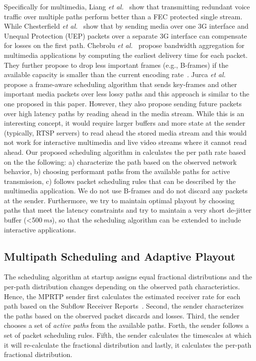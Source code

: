 Specifically for multimedia, Liang \emph{et al.}~\cite{Liang01} show that
transmitting redundant voice traffic over multiple paths perform better than a
FEC protected single stream. While Chesterfield \emph{et al.}~\cite{1498479}
show that by sending media over one 3G interface and Unequal Protection (UEP)
packets over a separate 3G interface can compensate for losses on the first
path. Chebrolu \emph{et al.}~\cite{1599407} propose bandwidth aggregation for
multimedia applications by computing the earliest delivery time for each
packet. They further propose to drop less important frames (e.g., B-frames) if
the available capacity is smaller than the current encoding
rate~\cite{1313320}. Jurca \emph{et al.}~\cite{4130370:jurca} propose a
frame-aware scheduling algorithm that sends key-frames and other important
media packets over less lossy paths and this approach is similar to the one
proposed in this paper. However, they also propose sending future packets over
high latency paths by reading ahead in the media stream. While this is an
interesting concept, it would require larger buffers and more state at the
sender (typically, RTSP servers) to read ahead the stored media stream and
this would not work for interactive multimedia and live video streams where it
cannot read ahead. Our proposed scheduling algorithm in 
calculates the per path rate based on the the following: a) characterize the
path based on the observed network behavior, b) choosing performant paths from
the available paths for active transmission, c) follows packet scheduling
rules that can be described by the multimedia application. We do not use
B-frames and do not discard any packets at the sender. Furthermore, we try to
maintain optimal playout by choosing paths that meet the latency constraints
and try to maintain a very short de-jitter buffer (<500\,\emph{ms}), so that
the scheduling algorithm can be extended to include interactive applications.
\subsection{Multipath Scheduling and Adaptive Playout}

The scheduling algorithm at startup assigns equal fractional distributions and
the per-path distribution changes depending on the observed path
characteristics. Hence, the MPRTP sender first calculates the estimated
receiver rate for each path based on the Subflow Receiver
Reports~\cite{draft.mprtp}. Second, the sender characterizes the paths based
on the observed packet discards and losses. Third, the sender chooses a set of
\emph{active paths} from the available paths. Forth, the sender follows a set
of packet scheduling rules. Fifth, the sender calculates the timescales at
which it will re-calculate the fractional distribution and lastly, it
calculates the per-path fractional distribution.

